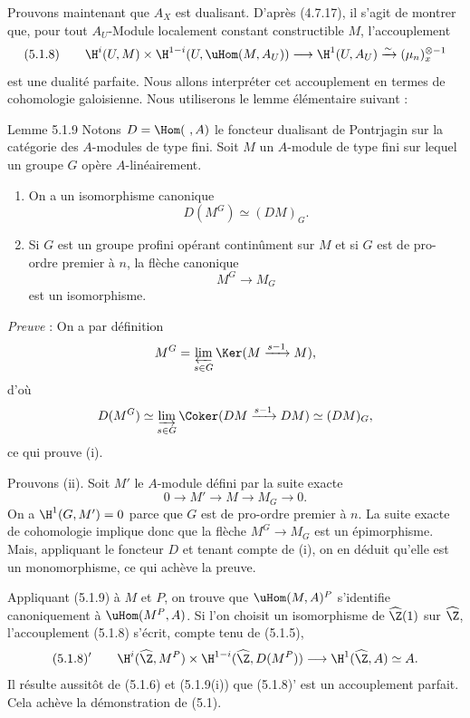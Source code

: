 Prouvons maintenant que $A_X$ est dualisant. D'après (4.7.17), il s'agit de montrer que, pour tout $A_U$-Module localement constant constructible $M$, l'accouplement
\[
(5.1.8)\qquad \H^i(U,M)\times\H^{1-i}(U,\uHom(M,A_U))\longrightarrow \H^1(U,A_U)\xrightarrow{\sim}(\mu_n)_x^{\otimes -1}\]
est une dualité parfaite. Nous allons interpréter cet accouplement en termes de cohomologie galoisienne. Nous utiliserons le lemme élémentaire suivant :

\begin{statement}{Lemme 5.1.9}
Notons $D=\Hom(\ ,A)$ le foncteur dualisant de Pontrjagin sur la catégorie des $A$-modules de type fini. Soit $M$ un $A$-module de type fini sur lequel un groupe $G$ opère $A$-linéairement.
\begin{enumerate}[label=(\roman*)]
\item On a un isomorphisme canonique
\[
D(M^G)\simeq (DM)_G.
\]
\item Si $G$ est un groupe profini opérant continûment sur $M$ et si $G$ est de pro-ordre premier à $n$, la flèche canonique
\[
M^G\longrightarrow M_G
\]
est un isomorphisme.
\end{enumerate}
\end{statement}

\emph{Preuve} : On a par définition
\[
M^G=\varprojlim_{s\in G}\Ker(M\xrightarrow{s-1}M),
\]
d'où
\[
D(M^G)\simeq \varinjlim_{s\in G}\Coker(DM\xrightarrow{s-1}DM)\simeq (DM)_G,
\]
ce qui prouve (i).

Prouvons (ii). Soit $M'$ le $A$-module défini par la suite exacte
\[
0\longrightarrow M'\longrightarrow M\longrightarrow M_G\longrightarrow0.
\]
On a $\H^1(G,M')=0$ parce que $G$ est de pro-ordre premier à $n$. La suite exacte de cohomologie implique donc que la flèche $M^G\to M_G$ est un épimorphisme. Mais, appliquant le foncteur $D$ et tenant compte de (i), on en déduit qu'elle est un monomorphisme, ce qui achève la preuve.

Appliquant (5.1.9) à $M$ et $P$, on trouve que $\uHom(M,A)^P$ s'identifie canoniquement à $\uHom(M^P,A)$. Si l'on choisit un isomorphisme de $\widehat{\Z}(1)$ sur $\widehat{\Z}$, l'accouplement (5.1.8) s'écrit, compte tenu de (5.1.5),
\[
(5.1.8)'\qquad \H^i(\widehat{\Z},M^P)\times\H^{1-i}(\widehat{\Z},D(M^P))\longrightarrow\H^1(\widehat{\Z},A)\simeq A.
\]
Il résulte aussitôt de (5.1.6) et (5.1.9(i)) que (5.1.8)' est un accouplement parfait. Cela achève la démonstration de (5.1).

